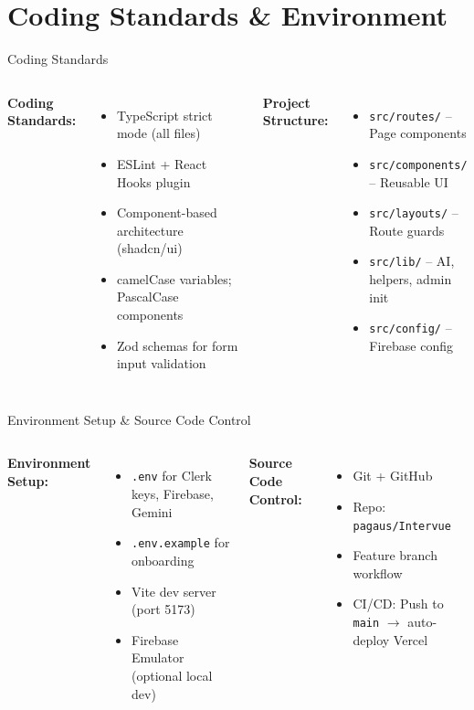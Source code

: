 \documentclass{beamer}
\begin{document}
\section{Coding Standards \& Environment}
\begin{frame}{Coding Standards}
\small
\begin{columns}[t]
\textbf{Coding Standards:}
\begin{itemize}\setlength{\itemsep}{2pt}
    \item TypeScript strict mode (all files)
    \item ESLint + React Hooks plugin
    \item Component-based architecture (shadcn/ui)
    \item camelCase variables; PascalCase components
    \item Zod schemas for form input validation
\end{itemize}
\textbf{Project Structure:}
\begin{itemize}\setlength{\itemsep}{2pt}
    \item \texttt{src/routes/} -- Page components
    \item \texttt{src/components/} -- Reusable UI
    \item \texttt{src/layouts/} -- Route guards
    \item \texttt{src/lib/} -- AI, helpers, admin init
    \item \texttt{src/config/} -- Firebase config
\end{itemize}
\end{columns}
\end{frame}

\begin{frame}{Environment Setup \& Source Code Control}
\small
\begin{columns}[t]
\textbf{Environment Setup:}
\begin{itemize}\setlength{\itemsep}{2pt}
    \item \texttt{.env} for Clerk keys, Firebase, Gemini
    \item \texttt{.env.example} for onboarding
    \item Vite dev server (port 5173)
    \item Firebase Emulator (optional local dev)
\end{itemize}
\textbf{Source Code Control:}
\begin{itemize}\setlength{\itemsep}{2pt}
    \item Git + GitHub
    \item Repo: \texttt{pagaus/Intervue}
    \item Feature branch workflow
    \item CI/CD: Push to \texttt{main} $\rightarrow$ auto-deploy Vercel
\end{itemize}
\end{columns}
\end{frame}
\end{document}
